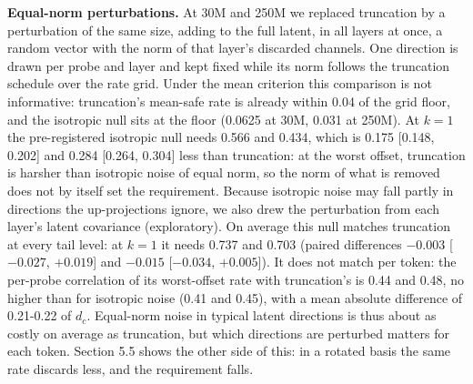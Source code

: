 \documentclass[11pt]{article}
\begin{document}
\textbf{Equal-norm perturbations.} At 30M and 250M we replaced truncation by a perturbation of the same size, adding to the full latent, in all layers at once, a random vector with the norm of that layer's discarded channels. One direction is drawn per probe and layer and kept fixed while its norm follows the truncation schedule over the rate grid. Under the mean criterion this comparison is not informative: truncation's mean-safe rate is already within 0.04 of the grid floor, and the isotropic null sits at the floor (0.0625 at 30M, 0.031 at 250M). At $k=1$ the pre-registered isotropic null needs 0.566 and 0.434, which is 0.175 [0.148, 0.202] and 0.284 [0.264, 0.304] less than truncation: at the worst offset, truncation is harsher than isotropic noise of equal norm, so the norm of what is removed does not by itself set the requirement. Because isotropic noise may fall partly in directions the up-projections ignore, we also drew the perturbation from each layer's latent covariance (exploratory). On average this null matches truncation at every tail level: at $k=1$ it needs 0.737 and 0.703 (paired differences $-0.003$ [$-0.027$, $+0.019$] and $-0.015$ [$-0.034$, $+0.005$]). It does not match per token: the per-probe correlation of its worst-offset rate with truncation's is 0.44 and 0.48, no higher than for isotropic noise (0.41 and 0.45), with a mean absolute difference of 0.21-0.22 of $d_c$. Equal-norm noise in typical latent directions is thus about as costly on average as truncation, but which directions are perturbed matters for each token. Section 5.5 shows the other side of this: in a rotated basis the same rate discards less, and the requirement falls.
\end{document}
